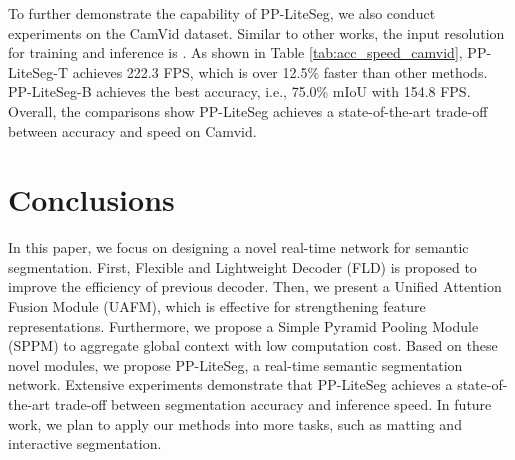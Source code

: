 \documentclass[10pt,twocolumn,letterpaper]{article}
\begin{document}
To further demonstrate the capability of PP-LiteSeg, we also conduct experiments on the CamVid dataset.
Similar to other works, the input resolution for training and inference is .
As shown in Table \ref{tab:acc_speed_camvid}, PP-LiteSeg-T achieves 222.3 FPS, which is over 12.5\% faster than other methods.
PP-LiteSeg-B achieves the best accuracy, i.e., 75.0\% mIoU with 154.8 FPS.
Overall, the comparisons show PP-LiteSeg achieves a state-of-the-art trade-off between accuracy and speed on Camvid.

\section{Conclusions}
\label{sec:conclusions}

In this paper, we focus on designing a novel real-time network for semantic segmentation.
First, Flexible and Lightweight Decoder (FLD) is proposed to improve the efficiency of previous decoder.
Then, we present a Unified Attention Fusion Module (UAFM), which is effective for strengthening feature representations.
Furthermore, we propose a Simple Pyramid Pooling Module (SPPM) to aggregate global context with low computation cost.
Based on these novel modules, we propose PP-LiteSeg, a real-time semantic segmentation network.
Extensive experiments demonstrate that PP-LiteSeg achieves a state-of-the-art trade-off between segmentation accuracy and inference speed.
In future work, we plan to apply our methods into more tasks, such as matting and interactive segmentation.



{\small


}
\end{document}

